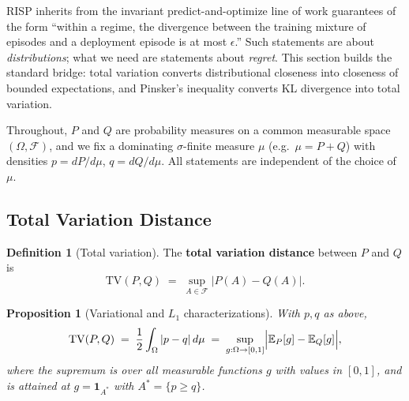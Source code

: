 \documentclass[11pt,a4paper]{article}
\theoremstyle{definition}
\newtheorem{definition}{Definition}[section]
\theoremstyle{plain}
\newtheorem{proposition}{Proposition}[section]
\newcommand{\E}{\mathbb{E}}
\newcommand{\TV}{\mathrm{TV}}
\newcommand{\nm}{\textsc{RISP}}
\begin{document}
\nm{} inherits from the invariant predict-and-optimize line of work
\cite{yan2026invpnco} guarantees of the form ``within a regime, the
divergence between the training mixture of episodes and a deployment episode
is at most $\epsilon$.'' Such statements are about \emph{distributions}; what
we need are statements about \emph{regret}. This section builds the standard
bridge: total variation converts distributional closeness into closeness of
bounded expectations, and Pinsker's inequality converts KL divergence into
total variation.

Throughout, $P$ and $Q$ are probability measures on a common measurable space
$(\Omega, \mathcal{F})$, and we fix a dominating $\sigma$-finite measure
$\mu$ (e.g.\ $\mu = P + Q$) with densities $p = dP/d\mu$, $q = dQ/d\mu$. All
statements are independent of the choice of $\mu$.

\subsection{Total Variation Distance}

\begin{definition}[Total variation]
\label{def:dd1-tv}
The \textbf{total variation distance} between $P$ and $Q$ is
\begin{equation}
\label{eq:dd1-tv-def}
\TV(P, Q) \;=\; \sup_{A \in \mathcal{F}} \bigl| P(A) - Q(A) \bigr|.
\end{equation}
\end{definition}

\begin{proposition}[Variational and $L_1$ characterizations]
\label{prop:dd1-tv-variational}
With $p, q$ as above,
\begin{equation}
\label{eq:dd1-tv-three}
\TV(P, Q)
\;=\; \frac{1}{2} \int_\Omega |p - q| \, d\mu
\;=\; \sup_{g : \Omega \to [0, 1]} \Bigl| \E_P[g] - \E_Q[g] \Bigr|,
\end{equation}
where the supremum is over all measurable functions $g$ with values in
$[0,1]$, and is attained at $g = \mathbf{1}_{A^*}$ with
$A^* = \{p \ge q\}$.
\end{proposition}
\end{document}
